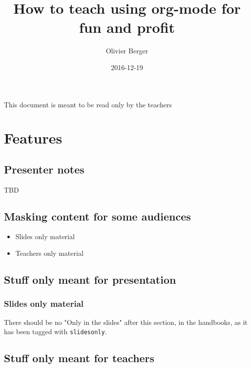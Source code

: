 \documentclass[a4paper]{article}
\author{Olivier Berger}
\date{2016-12-19}
\title{How to teach using org-mode for fun and profit}
\begin{document}
\maketitle
\setcounter{tocdepth}{2}
\tableofcontents

\begin{ABSTRACT}
\begin{shaded}
This document is meant to be read only by the teachers
\end{shaded}
\end{ABSTRACT}




\section{Features}
\label{sec:orge1796c4}
\subsection{Presenter notes}
\label{sec:org65f7ec6}

TBD

\subsection{Masking content for some audiences}
\label{sec:org2cfcf3b}

\begin{itemize}
\item Slides only material
\item Teachers only material
\end{itemize}

\subsection{Stuff only meant for presentation}
\label{sec:orgb9b4e13}

\subsubsection{Slides only material}
\label{sec:org1e81c62}

There should be no "Only in the slides" after this section, in the
handbooks, as it has been tagged with \texttt{slidesonly}.

\subsection{Stuff only meant for teachers}
\label{sec:orgee69b7e}
\end{document}
